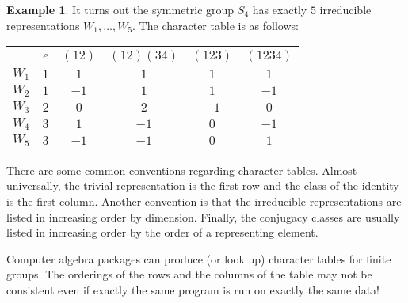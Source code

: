 \documentclass[12pt]{article}
\theoremstyle{plain}
\theoremstyle{definition}
\newtheorem{example}[theorem]{Example}
\theoremstyle{remark}
\numberwithin{equation}{section}
\begin{document}
\begin{example}
It turns out the symmetric group $S_4$ has exactly $5$ irreducible
representations $W_1, \ldots, W_5$.
The character table is as follows:
\begin{center}
\begin{tabular}{|c|c|c|c|c|c|}
\hline 
 & $e $ & $(12)$ & $(12)(34)$ & $(123)$ & $(1234)$\\
\hline 
\hline 
$W_1$ & $1$ & $1$ & $1$ & $1$ & $1$\\
\hline 
$W_2$ & $1$ & $-1$ & $1$ & $1$ & $-1$\\
\hline 
$W_3$ & $2$ & $0$ & $2$ & $-1$ & $0$\\
\hline 
$W_4$ & $3$ & $1$ & $-1$ & $0$ & $-1$\\
\hline 
$W_5$ & $3$ & $-1$ & $-1$ & $0$ & $1$\\
\hline 
\end{tabular}
\end{center}
\end{example}

There are some common conventions regarding character tables.
Almost universally,
the trivial representation is the first row and the class of the
identity is the first column.
Another convention is that the irreducible representations are listed in
increasing order by dimension.
Finally, the conjugacy classes are usually listed in increasing order by
the order of a representing element.

Computer algebra packages can produce (or look up) character tables
for finite groups.  The orderings of the rows and the columns of the
table may not be consistent even if exactly the same program is run on
exactly the same data!




\end{document}
